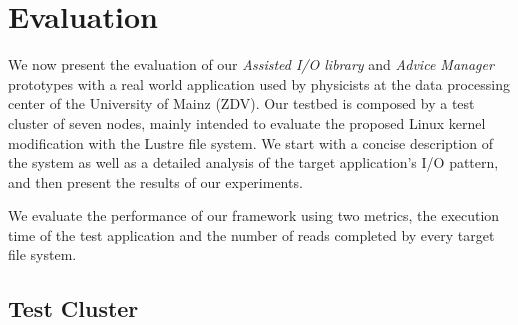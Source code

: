 \section{Evaluation}
\label{sec: evaluation}
We now present the evaluation of our \textit{Assisted I/O library} and \textit{Advice Manager} prototypes with a real world application used by physicists at the data processing center of the University of Mainz (ZDV). Our testbed is composed by %
a test cluster of seven nodes, mainly intended to evaluate the proposed Linux kernel modification with the Lustre file system. %
We start with a concise description of the %
system as well as a detailed analysis of the target application's I/O pattern, and then present the results of our experiments. 

We evaluate the performance of our framework using two metrics, the execution time of the test application and the number of reads completed by every target file system. %

\subsection{Test Cluster}
\label{subsec: test_cluster}

